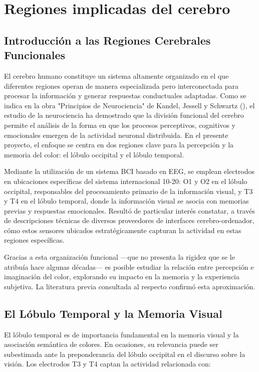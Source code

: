\chapter{Regiones implicadas del cerebro}\label{ch:brain_regions}

\section{Introducción a las Regiones Cerebrales Funcionales}

El cerebro humano constituye un sistema altamente organizado en el que diferentes regiones operan de manera especializada pero interconectada para procesar la información y generar respuestas conductuales adaptadas. Como se indica en la obra "Principios de Neurociencia" de Kandel, Jessell y Schwartz (\citeyear{Kandel_Jessell_Schwartz_2001}), el estudio de la neurociencia ha demostrado que la división funcional del cerebro permite el análisis de la forma en que los procesos perceptivos, cognitivos y emocionales emergen de la actividad neuronal distribuida. En el presente proyecto, el enfoque se centra en dos regiones clave para la percepción y la memoria del color: el lóbulo occipital y el lóbulo temporal.

Mediante la utilización de un sistema BCI basado en EEG, se emplean electrodos en ubicaciones específicas del sistema internacional 10-20: O1 y O2 en el lóbulo occipital, responsables del procesamiento primario de la información visual, y T3 y T4 en el lóbulo temporal, donde la información visual se asocia con memorias previas y respuestas emocionales. Resultó de particular interés constatar, a través de descripciones técnicas de diversos proveedores de interfaces cerebro-ordenador, cómo estos sensores ubicados estratégicamente capturan la actividad en estas regiones específicas.

Gracias a esta organización funcional —que no presenta la rigidez que se le atribuía hace algunas décadas— es posible estudiar la relación entre percepción e imaginación del color, explorando su impacto en la memoria y la experiencia subjetiva. La literatura previa consultada al respecto confirmó esta aproximación.

\newpage

\section{El Lóbulo Temporal y la Memoria Visual}

El lóbulo temporal es de importancia fundamental en la memoria visual y la asociación semántica de colores. En ocasiones, su relevancia puede ser subestimada ante la preponderancia del lóbulo occipital en el discurso sobre la visión. Los electrodos T3 y T4 captan la actividad relacionada con:

